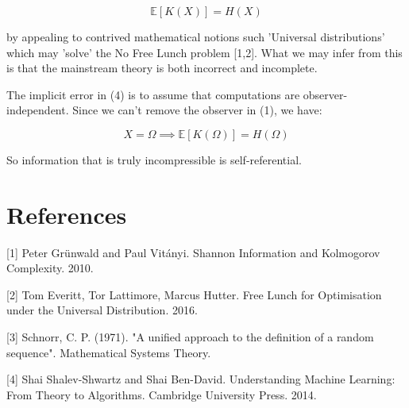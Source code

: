 \documentclass{article}
\begin{document}
\begin{equation}
\mathbb{E}[K(X)] = H(X)
\end{equation}

by appealing to contrived mathematical notions such 'Universal distributions' which may 'solve' the No Free Lunch problem [1,2]. What we may infer from this is that the mainstream theory is both incorrect and incomplete. 

The implicit error in (4) is to assume that computations are observer-independent. Since we can't remove the observer in (1),
we have:

\begin{equation}
X = \Omega \implies \mathbb{E}[K(\Omega)] = H(\Omega)
\end{equation}

So information that is truly incompressible is self-referential.

\section*{References}

\small
[1] Peter Grünwald and Paul Vitányi. Shannon Information and Kolmogorov Complexity. 2010.

[2] Tom Everitt, Tor Lattimore, Marcus Hutter. Free Lunch for Optimisation under the Universal Distribution. 2016.

[3] Schnorr, C. P. (1971). "A unified approach to the definition of a random sequence". Mathematical Systems Theory.

[4] Shai Shalev-Shwartz and Shai Ben-David. Understanding Machine Learning: From Theory to Algorithms. Cambridge University Press. 2014. 
\end{document}
